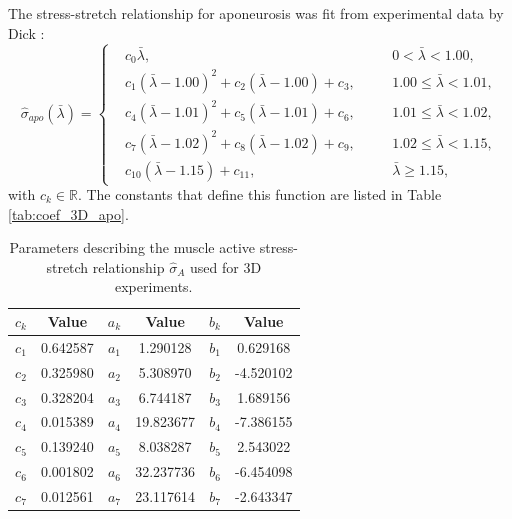 \documentclass{sfuthesis}
\numberwithin{equation}{section}
\numberwithin{figure}{chapter}
\numberwithin{table}{chapter}
\theoremstyle{definition}
\newcommand{\R}{\mathbb{R}}
\begin{document}
\begin{appendices}
The stress-stretch relationship for aponeurosis was fit from experimental data by Dick \cite{Taylor}:
\begin{equation} 
\widehat{\sigma}_{apo}(\bar{\lambda}) = \left\{
\begin{aligned}
&c_0\bar{\lambda}, \quad && 0 < \bar{\lambda} < 1.00, \\
&c_1 \left( \bar{\lambda} - 1.00 \right)^2 + c_2 \left( \bar{\lambda} - 1.00 \right) + c_3, \quad &&1.00 \leq \bar{\lambda} < 1.01, \\
&c_4 \left( \bar{\lambda} - 1.01 \right)^2 + c_5 \left( \bar{\lambda} - 1.01 \right) + c_6, \quad &&1.01 \leq \bar{\lambda} < 1.02, \\
&c_7 \left( \bar{\lambda} - 1.02 \right)^2 + c_8 \left( \bar{\lambda} - 1.02 \right) + c_9, \quad &&1.02 \leq \bar{\lambda} <1.15, \\
&c_{10} \left( \bar{\lambda} - 1.15 \right) + c_{11}, \quad && \bar{\lambda} \geq 1.15,
\end{aligned}
\right.
\end{equation}
with $c_k \in \R$. The constants that define this function are listed in Table \ref{tab:coef_3D_apo}.




\begin{table}
\centering 
\begin{tabular}{|c|c|c|c|c|c|}\hline
$c_k$ & Value & $a_k$ & Value & $b_k$ & Value \\\hline
$c_1$ & 0.642587 & $a_1$ & 1.290128 & $b_1$ & 0.629168 \\\hline
$c_2$ & 0.325980 & $a_2$ & 5.308970 & $b_2$ & -4.520102 \\\hline
$c_3$ & 0.328204 & $a_3$ & 6.744187 & $b_3$ & 1.689156 \\\hline
$c_4$ & 0.015389 & $a_4$ & 19.823677 & $b_4$ & -7.386155 \\\hline
$c_5$ & 0.139240 & $a_5$ & 8.038287 & $b_5$ & 2.543022 \\\hline
$c_6$ & 0.001802 & $a_6$ & 32.237736 & $b_6$ & -6.454098 \\\hline
$c_7$ & 0.012561 & $a_7$ & 23.117614 & $b_7$ & -2.643347 \\\hline
\end{tabular}
\caption{Parameters describing the muscle active stress-stretch relationship $\widehat{\sigma}_A$ used for 3D experiments.\label{tab:coef_3D_active}}
\end{table}


\end{appendices}
\end{document}
